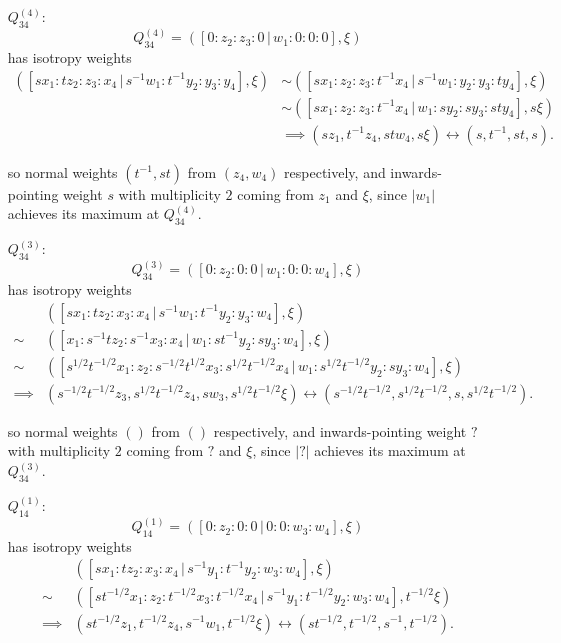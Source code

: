 \documentclass{article}
\begin{document}
\begin{itemize}
		\item[$Q_{34}^{(4)}$:]
		\[
			Q_{34}^{(4)} = \left( [ 0 : z_{2} : z_{3} : 0 \, | \, w_{1} : 0 : 0 : 0 ], \xi \right)
		\]
		has isotropy weights
		\begin{align*}
			\left( [sx_{1} : tz_{2} : z_{3} : x_{4} \, | \, s^{-1}w_{1} : t^{-1}y_{2} : y_{3} : y_{4}], \xi \right) &\sim \left( [sx_{1} : z_{2} : z_{3} : t^{-1}x_{4} \, | \, s^{-1}w_{1} : y_{2} : y_{3} : ty_{4}], \xi \right) \\ &\sim \left( [sx_{1} : z_{2} : z_{3} : t^{-1}x_{4} \, | \, w_{1} : sy_{2} : sy_{3} : sty_{4}], s\xi \right) \\ &\implies (sz_{1}, t^{-1}z_{4}, stw_{4}, s\xi) \longleftrightarrow (s, t^{-1}, st, s).
		\end{align*}
		
		so normal weights $(t^{-1}, st)$ from $(z_{4}, w_{4})$ respectively, and inwards-pointing weight $s$ with multiplicity $2$ coming from $z_{1}$ and $\xi$, since $|w_{1}|$ achieves its maximum at $Q_{34}^{(4)}$.
	
		\item[$Q_{34}^{(3)}$:]
		\[
			Q_{34}^{(3)} = \left( [ 0 : z_{2} : 0 : 0 \, | \, w_{1} : 0 : 0 : w_{4} ], \xi \right)
		\]
		has isotropy weights
		\begin{align*}
			& \left( [sx_{1} : tz_{2} : x_{3} : x_{4} \, | \, s^{-1}w_{1} : t^{-1}y_{2} : y_{3} : w_{4}], \xi \right) \\ \sim &\left( [x_{1} : s^{-1}tz_{2} : s^{-1}x_{3} : x_{4} \, | \, w_{1} : st^{-1}y_{2} : sy_{3} : w_{4}], \xi \right) \\ \sim &\left( [ s^{1/2}t^{-1/2}x_{1} : z_{2} : s^{-1/2}t^{1/2}x_{3} : s^{1/2}t^{-1/2}x_{4} \, | \, w_{1} : s^{1/2}t^{-1/2}y_{2} : sy_{3} : w_{4}], \xi \right) \\ \implies &(s^{-1/2}t^{-1/2}z_{3}, s^{1/2}t^{-1/2}z_{4}, sw_{3}, s^{1/2}t^{-1/2} \xi) \longleftrightarrow (s^{-1/2}t^{-1/2}, s^{1/2}t^{-1/2}, s, s^{1/2}t^{-1/2}).
		\end{align*}
		
		so normal weights $()$ from $()$ respectively, and inwards-pointing weight $?$ with multiplicity $2$ coming from $?$ and $\xi$, since $|?|$ achieves its maximum at $Q_{34}^{(3)}$.
	
		\item[$Q_{14}^{(1)}$:]
		\[
		Q_{14}^{(1)} = \left( [ 0 : z_{2} : 0 : 0 \, | \, 0 : 0 : w_{3} : w_{4} ], \xi \right)
		\]
		has isotropy weights
		\begin{align*}
			& \left( [sx_{1} : tz_{2} : x_{3} : x_{4} \, | \, s^{-1}y_{1} : t^{-1}y_{2} : w_{3} : w_{4}], \xi \right) \\ \sim & \left( [st^{-1/2}x_{1} : z_{2} : t^{-1/2}x_{3} : t^{-1/2}x_{4} \, | \, s^{-1}y_{1} : t^{-1/2}y_{2} : w_{3} : w_{4}], t^{-1/2}\xi \right) \\ \implies &(st^{-1/2}z_{1}, t^{-1/2}z_{4}, s^{-1}w_{1}, t^{-1/2}\xi) \longleftrightarrow (st^{-1/2}, t^{-1/2}, s^{-1}, t^{-1/2}).
		\end{align*}
		

\end{itemize}
\end{document}
